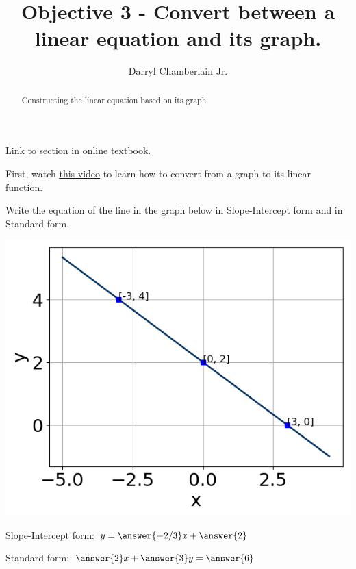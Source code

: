 \documentclass{ximera}
\author{Darryl Chamberlain Jr.}
\title{Objective 3 - Convert between a linear equation and its graph.}
\begin{document}
\begin{abstract}
Constructing the linear equation based on its graph. 
\end{abstract}
\maketitle

\href{https://cnx.org/contents/mwjClAV_@8.1:62_eXnY6@14/Linear-Equations-in-One-Variable}{Link to section in online textbook.}


First, watch \underline{\href{https://mediasite.video.ufl.edu/Mediasite/Play/be61784320d14422820fb6f774fd7b7b1d}{this video}} to learn how to convert from a graph to its linear function. 


\begin{question}
Write the equation of the line in the graph below in Slope-Intercept form and in Standard form. 

\includegraphics[scale=0.5]{question1.png}

Slope-Intercept form: $y = \answer{-2/3}x + \answer{2}$

Standard form: $\answer{2} x + \answer{3} y = \answer{6}$
\end{question}
\end{document}

